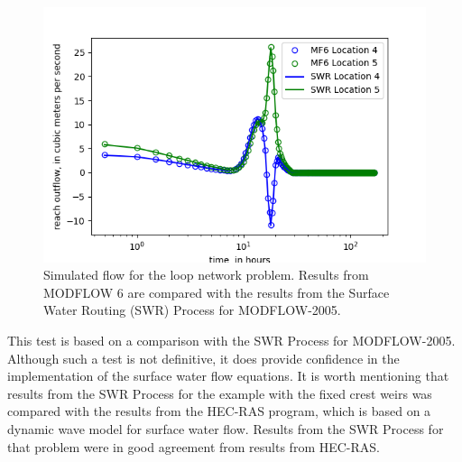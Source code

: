 \documentclass[fleqn]{article}
\begin{document}
\begin{figure}
	\centering
	\includegraphics[scale=0.70]{figures/loop_network_flow.png}
	\caption[Simulated flow for the loop network problem.]{Simulated flow for the loop network problem.  Results from MODFLOW 6 are compared with the results from the Surface Water Routing (SWR) Process for MODFLOW-2005.}
	\label{fig:loop_network_flow}
\end{figure}

This test is based on a comparison with the SWR Process for MODFLOW-2005.  Although such a test is not definitive, it does provide confidence in the implementation of the surface water flow equations.  It is worth mentioning that results from the SWR Process for the example with the fixed crest weirs was compared with the results from the HEC-RAS program, which is based on a dynamic wave model for surface water flow.  Results from the SWR Process for that problem were in good agreement from results from HEC-RAS.

% 

 
\end{document}
